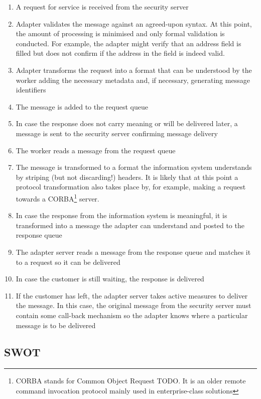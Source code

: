\documentclass[10pt,a4paper]{article}
\begin{document}
\begin{enumerate}
	\item A request for service is received from the security server
	\item Adapter validates the message against an agreed-upon syntax. At this point, the amount of processing is minimised and only formal validation is conducted. For example, the adapter might verify that an address field is filled but does not confirm if the address in the field is indeed valid.
	\item Adapter transforms the request into a format that can be understood by the worker adding the necessary metadata and, if necessary, generating message identifiers
	\item The message is added to the request queue
	\item In case the response does not carry meaning or will be delivered later, a message is sent to the security server confirming message delivery
	\item The worker reads a message from the request queue 
	\item The message is transformed to a format the information system understands by striping (but not discarding!) headers. It is likely that at this point a protocol transformation also takes place by, for example, making a request towards a CORBA\footnote{CORBA stands for Common Object Request TODO. It is an older remote command invocation protocol mainly used in enterprise-class solutions} server. 
	\item In case the response from the information system is meaningful, it is transformed into a message the adapter can understand and posted to the response queue
	\item The adapter server reads a message from the response queue and matches it to a request so it can be delivered
	\item In case the customer is still waiting, the response is delivered
	\item If the customer has left, the adapter server takes active measures to deliver the message. In this case, the original message from the security server must contain some call-back mechanism so the adapter knows where a particular message is to be delivered 
\end{enumerate}

\subsection{SWOT}
\end{document}
